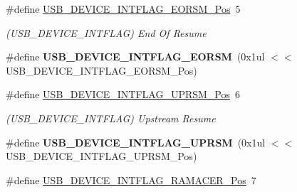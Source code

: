 \begin{DoxyCompactItemize}
\item 
\hypertarget{group___s_a_m_l21___u_s_b_gad9f17dc8d2b19fb440eb764f91e7b88e}{}\#define \hyperlink{group___s_a_m_l21___u_s_b_gad9f17dc8d2b19fb440eb764f91e7b88e}{U\+S\+B\+\_\+\+D\+E\+V\+I\+C\+E\+\_\+\+I\+N\+T\+F\+L\+A\+G\+\_\+\+E\+O\+R\+S\+M\+\_\+\+Pos}~5\label{group___s_a_m_l21___u_s_b_gad9f17dc8d2b19fb440eb764f91e7b88e}

\begin{DoxyCompactList}\small\item\em (U\+S\+B\+\_\+\+D\+E\+V\+I\+C\+E\+\_\+\+I\+N\+T\+F\+L\+A\+G) End Of Resume \end{DoxyCompactList}\item 
\hypertarget{group___s_a_m_l21___u_s_b_ga6a7810bc403594435eae77f134c424e3}{}\#define {\bfseries U\+S\+B\+\_\+\+D\+E\+V\+I\+C\+E\+\_\+\+I\+N\+T\+F\+L\+A\+G\+\_\+\+E\+O\+R\+S\+M}~(0x1ul $<$$<$ U\+S\+B\+\_\+\+D\+E\+V\+I\+C\+E\+\_\+\+I\+N\+T\+F\+L\+A\+G\+\_\+\+E\+O\+R\+S\+M\+\_\+\+Pos)\label{group___s_a_m_l21___u_s_b_ga6a7810bc403594435eae77f134c424e3}

\item 
\hypertarget{group___s_a_m_l21___u_s_b_gabd5404f0e8add7199c577eee270d61ed}{}\#define \hyperlink{group___s_a_m_l21___u_s_b_gabd5404f0e8add7199c577eee270d61ed}{U\+S\+B\+\_\+\+D\+E\+V\+I\+C\+E\+\_\+\+I\+N\+T\+F\+L\+A\+G\+\_\+\+U\+P\+R\+S\+M\+\_\+\+Pos}~6\label{group___s_a_m_l21___u_s_b_gabd5404f0e8add7199c577eee270d61ed}

\begin{DoxyCompactList}\small\item\em (U\+S\+B\+\_\+\+D\+E\+V\+I\+C\+E\+\_\+\+I\+N\+T\+F\+L\+A\+G) Upstream Resume \end{DoxyCompactList}\item 
\hypertarget{group___s_a_m_l21___u_s_b_gaa4e9003167a3ba96c189673a9382e4fd}{}\#define {\bfseries U\+S\+B\+\_\+\+D\+E\+V\+I\+C\+E\+\_\+\+I\+N\+T\+F\+L\+A\+G\+\_\+\+U\+P\+R\+S\+M}~(0x1ul $<$$<$ U\+S\+B\+\_\+\+D\+E\+V\+I\+C\+E\+\_\+\+I\+N\+T\+F\+L\+A\+G\+\_\+\+U\+P\+R\+S\+M\+\_\+\+Pos)\label{group___s_a_m_l21___u_s_b_gaa4e9003167a3ba96c189673a9382e4fd}

\item 
\hypertarget{group___s_a_m_l21___u_s_b_ga474b264fedeb6c4022d6d4ce68e3091c}{}\#define \hyperlink{group___s_a_m_l21___u_s_b_ga474b264fedeb6c4022d6d4ce68e3091c}{U\+S\+B\+\_\+\+D\+E\+V\+I\+C\+E\+\_\+\+I\+N\+T\+F\+L\+A\+G\+\_\+\+R\+A\+M\+A\+C\+E\+R\+\_\+\+Pos}~7\label{group___s_a_m_l21___u_s_b_ga474b264fedeb6c4022d6d4ce68e3091c}


\end{DoxyCompactItemize}
